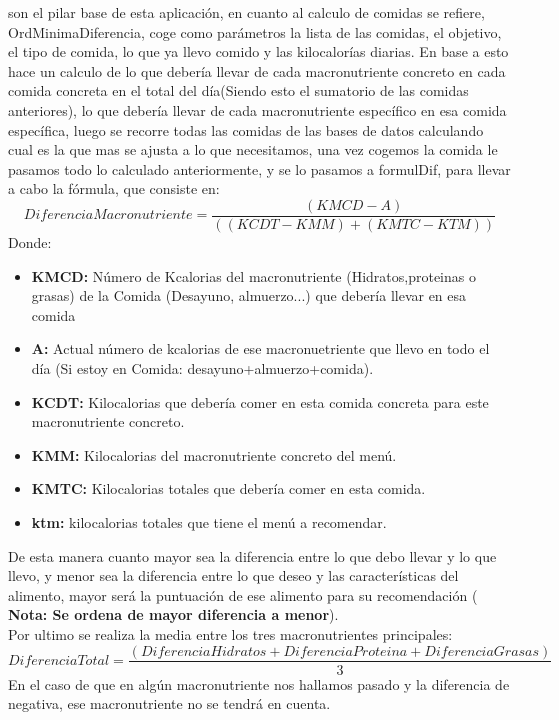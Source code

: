 son el pilar base de esta aplicación, en cuanto al calculo de comidas se refiere, OrdMinimaDiferencia, coge como parámetros la lista de las comidas, el objetivo, el tipo de comida, lo que ya llevo comido y las kilocalorías diarias. En base a esto hace un calculo de lo que debería llevar de cada macronutriente concreto en cada comida concreta en el total del día(Siendo esto el sumatorio de las comidas anteriores), lo que debería llevar de cada macronutriente específico en esa comida específica, luego se recorre todas las comidas de las bases de datos calculando cual es la que mas se ajusta a lo que necesitamos, una vez cogemos la comida le pasamos todo lo calculado anteriormente, y se lo pasamos a formulDif, para llevar a cabo la fórmula, que consiste en:
\begin{equation}
DiferenciaMacronutriente = \frac{(KMCD - A)}{((KCDT-KMM)+(KMTC-KTM))}
\end{equation}
Donde:
\begin{itemize}
\item \textbf{KMCD:} Número de Kcalorias del macronutriente (Hidratos,proteinas o grasas) de la Comida (Desayuno, almuerzo...) que debería llevar en esa comida
\item \textbf{A:} Actual número de kcalorias de ese macronuetriente que llevo en todo el día (Si estoy en Comida: desayuno+almuerzo+comida).
\item \textbf{KCDT:} Kilocalorias que debería comer en esta comida concreta para este macronutriente concreto.
\item \textbf{KMM:} Kilocalorias del macronutriente concreto del menú.
\item \textbf{KMTC:} Kilocalorias totales que debería comer en esta comida.
\item \textbf{ktm:} kilocalorias totales que tiene el menú a recomendar.

\end{itemize}

De esta manera cuanto mayor sea la diferencia entre lo que debo llevar y lo que llevo, y menor sea la diferencia entre lo que deseo y las características del alimento, mayor será la puntuación de ese alimento para su recomendación ( \textbf{Nota: Se ordena de mayor diferencia a menor}).\\
Por ultimo se realiza la media entre los tres macronutrientes principales:
\begin{equation}
DiferenciaTotal = \frac{(DiferenciaHidratos+DiferenciaProteina+DiferenciaGrasas)}{3}
\end{equation} 
En el caso de que en algún macronutriente nos hallamos pasado y la diferencia de negativa, ese macronutriente no se tendrá en cuenta.
